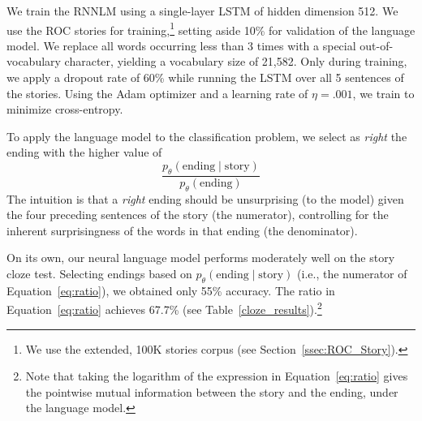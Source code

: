 \documentclass[11pt,a4paper]{article}
\newcommand{\secref}[1]{Section~\ref{ssec:#1}}
\newcommand{\tabref}[1]{Table~\ref{#1}}
\newcommand{\resolved}[1]{}
\newcommand{\roy}[1]{{\color{orange}\textsc{[#1 --rs]}}}
\newcommand{\nascomment}[1]{{\color{blue}\textsc{[#1 --nas]}}}
\renewcommand{\roy}[1]{{\color{orange}[#1 --rs]}}
\renewcommand{\roy}[1]{#1}
\renewcommand{\nascomment}[1]{}
\begin{document}
We train the RNNLM using a single-layer LSTM of hidden dimension 512.
We use the ROC stories for training,\footnote{We use the extended, 100K stories corpus (see \secref{ROC_Story}).} setting aside 10\% for validation of the language model. 
We replace all words occurring less than 3 times with a special
out-of-vocabulary character, yielding a vocabulary size of  21,582.
Only during training, we apply a dropout rate of 60\% while running the LSTM over all 5 sentences of the stories. 
Using the Adam optimizer \cite{kingma2014adam} and a learning rate of
$\eta=.001$, we train to minimize cross-entropy. %

To apply the language model to the classification problem, we select
as \emph{right} the ending with the higher value of
\begin{equation}
\frac{p_\theta(\textrm{ending} \mid
  \textrm{story})}{p_\theta(\textrm{ending})} \label{eq:ratio}
\end{equation}
The intuition is that a \emph{right} ending should be unsurprising (to
the model)
given the four preceding sentences of the story (the numerator), controlling for the
inherent surprisingness of the words in that ending (the denominator).

\resolved{\nascomment{please check the paragraph above.  we need to say how we
  use the LM before we evaluate it!  also, has anyone tried an approach like this
  before?  even if we aren't exactly replicating another paper, if
  someone else used RNNs for this task, we should credit them.}
  \roy{Ours is the first work to publish LSTM results on this dataset.}}

On its own, our neural language model performs moderately well on the story cloze test. 
Selecting endings based on $p_\theta(\textrm{ending} \mid \textrm{story})$ (i.e., the numerator of
Equation~\ref{eq:ratio}), we obtained only 55\% accuracy.   The ratio
in Equation~\ref{eq:ratio} achieves 67.7\%  (see
\tabref{cloze_results}).\footnote{Note that taking the logarithm of
  the expression in Equation~\ref{eq:ratio} gives the pointwise mutual
information between the story and the ending, under the language
model.\nascomment{added this to replace the hedging that was here before}\resolved{\roy{We actually also use the RNNLM features in log space. Add that in the next paragraph.}}}
\end{document}
